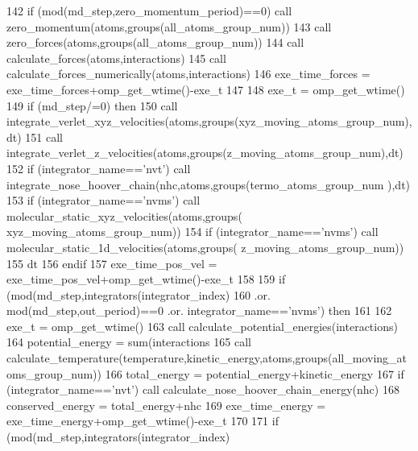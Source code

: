 \begin{DoxyCode}
142     \textcolor{keywordflow}{if} (mod(md\_step,zero\_momentum\_period)==0) \textcolor{keyword}{call }zero\_momentum(atoms,groups(all\_atoms\_group\_num))
143     \textcolor{keyword}{call }zero\_forces(atoms,groups(all\_atoms\_group\_num))
144     \textcolor{keyword}{call }calculate\_forces(atoms,interactions)
145     \textcolor{keyword}{call }calculate\_forces\_numerically(atoms,interactions)
146     exe\_time\_forces = exe\_time\_forces+omp\_get\_wtime()-exe\_t
147 
148     exe\_t = omp\_get\_wtime()
149     \textcolor{keywordflow}{if} (md\_step/=0) \textcolor{keywordflow}{then}
150         \textcolor{keyword}{call }integrate\_verlet\_xyz\_velocities(atoms,groups(xyz\_moving\_atoms\_group\_num),dt)
151         \textcolor{keyword}{call }integrate\_verlet\_z\_velocities(atoms,groups(z\_moving\_atoms\_group\_num),dt)
152         \textcolor{keywordflow}{if} (integrator\_name==\textcolor{stringliteral}{'nvt'}) \textcolor{keyword}{call }integrate\_nose\_hoover\_chain(nhc,atoms,groups(termo\_atoms\_group\_num
      ),dt)
153         \textcolor{keywordflow}{if} (integrator\_name==\textcolor{stringliteral}{'nvms'}) \textcolor{keyword}{call }molecular\_static\_xyz\_velocities(atoms,groups(
      xyz\_moving\_atoms\_group\_num))
154         \textcolor{keywordflow}{if} (integrator\_name==\textcolor{stringliteral}{'nvms'}) \textcolor{keyword}{call }molecular\_static\_1d\_velocities(atoms,groups(
      z\_moving\_atoms\_group\_num))
155         dt%
156 \textcolor{keywordflow}{    endif}
157     exe\_time\_pos\_vel = exe\_time\_pos\_vel+omp\_get\_wtime()-exe\_t
158     
159     \textcolor{keywordflow}{if} (mod(md\_step,integrators(integrator\_index)%
160     .or. mod(md\_step,out\_period)==0 .or. integrator\_name==\textcolor{stringliteral}{'nvms'}) \textcolor{keywordflow}{then}
161 
162         exe\_t = omp\_get\_wtime()
163         \textcolor{keyword}{call }calculate\_potential\_energies(interactions)
164         potential\_energy = sum(interactions%
165         \textcolor{keyword}{call }calculate\_temperature(temperature,kinetic\_energy,atoms,groups(all\_moving\_atoms\_group\_num))
166         total\_energy = potential\_energy+kinetic\_energy
167         \textcolor{keywordflow}{if} (integrator\_name==\textcolor{stringliteral}{'nvt'}) \textcolor{keyword}{call }calculate\_nose\_hoover\_chain\_energy(nhc)
168         conserved\_energy = total\_energy+nhc%
169         exe\_time\_energy = exe\_time\_energy+omp\_get\_wtime()-exe\_t
170         
171         \textcolor{keywordflow}{if} (mod(md\_step,integrators(integrator\_index)%

\end{DoxyCode}
